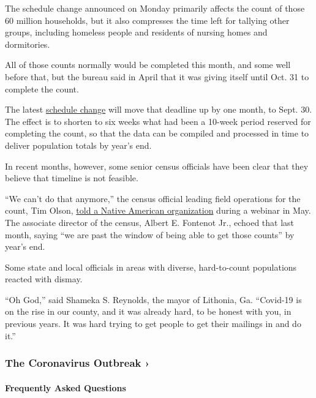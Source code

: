 The schedule change announced on Monday primarily affects the count of
those 60 million households, but it also compresses the time left for
tallying other groups, including homeless people and residents of
nursing homes and dormitories.

All of those counts normally would be completed this month, and some
well before that, but the bureau said in April that it was giving itself
until Oct. 31 to complete the count.

The latest
\href{https://www.nytimes3xbfgragh.onion/2020/07/28/us/trump-census.html}{schedule
change} will move that deadline up by one month, to Sept. 30. The effect
is to shorten to six weeks what had been a 10-week period reserved for
completing the count, so that the data can be compiled and processed in
time to deliver population totals by year's end.

In recent months, however, some senior census officials have been clear
that they believe that timeline is not feasible.

``We can't do that anymore,'' the census official leading field
operations for the count, Tim Olson,
\href{https://www.youtube.com/watch?v=F6IyJMtDDgY\&feature=youtu.be\&t=4688}{told
a Native American organization} during a webinar in May. The associate
director of the census, Albert E. Fontenot Jr., echoed that last month,
saying ``we are past the window of being able to get those counts'' by
year's end.

Some state and local officials in areas with diverse, hard-to-count
populations reacted with dismay.

``Oh God,'' said Shameka S. Reynolds, the mayor of Lithonia, Ga.
``Covid-19 is on the rise in our county, and it was already hard, to be
honest with you, in previous years. It was hard trying to get people to
get their mailings in and do it.''

\href{https://www.nytimes3xbfgragh.onion/news-event/coronavirus?action=click\&pgtype=Article\&state=default\&region=MAIN_CONTENT_3\&context=storylines_faq}{}

\hypertarget{the-coronavirus-outbreak-}{%
\subsubsection{The Coronavirus Outbreak
›}\label{the-coronavirus-outbreak-}}

\hypertarget{frequently-asked-questions}{%
\paragraph{Frequently Asked
Questions}\label{frequently-asked-questions}}

